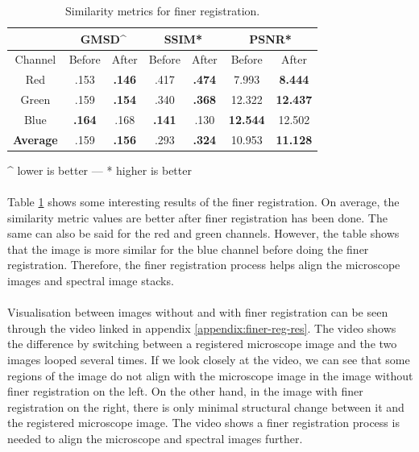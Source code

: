 \documentclass[12pt,oneside]{report}
\begin{document}
\begin{center}
\begin{table}[h]
\centering
\begin{tabular}{ c c c c c c c } 
 & \multicolumn{2}{c}{GMSD\^{}} & \multicolumn{2}{c}{SSIM*} & \multicolumn{2}{c}{PSNR*} \\
\hline
Channel & Before & After & Before & After & Before & After \\
\hline
Red              & .153          & \textbf{.146} & .417          & \textbf{.474} & 7.993           & \textbf{8.444} \\
Green            & .159          & \textbf{.154} & .340          & \textbf{.368} & 12.322          & \textbf{12.437} \\
Blue             & \textbf{.164} & .168          & \textbf{.141} & .130          & \textbf{12.544} & 12.502 \\
\textbf{Average} & .159          & \textbf{.156} & .293          & \textbf{.324} & 10.953          & \textbf{11.128} \\
\hline
\end{tabular}

\vspace{0.2cm}
\^{} lower is better --- * higher is better

\caption{Similarity metrics for finer registration.}
\label{table:finer-reg}
\end{table}
\end{center}

\paragraph{}
Table \ref{table:finer-reg} shows some interesting results of the finer registration. On average, the similarity metric values are better after finer registration has been done. The same can also be said for the red and green channels. However, the table shows that the image is more similar for the blue channel before doing the finer registration. Therefore, the finer registration process helps align the microscope images and spectral image stacks.

\paragraph{}
Visualisation between images without and with finer registration can be seen through the video linked in appendix \ref{appendix:finer-reg-res}. The video shows the difference by switching between a registered microscope image and the two images looped several times. If we look closely at the video, we can see that some regions of the image do not align with the microscope image in the image without finer registration on the left. On the other hand, in the image with finer registration on the right, there is only minimal structural change between it and the registered microscope image. The video shows a finer registration process is needed to align the microscope and spectral images further.
\end{document}
